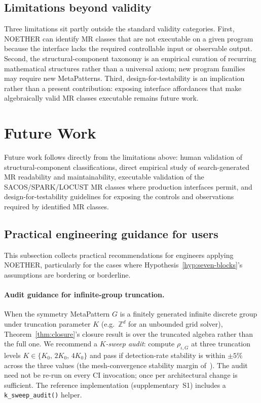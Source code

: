 \documentclass[acmsmall,screen,review]{acmart}
\begin{document}
\subsection{Limitations beyond validity}
\label{subsec:limitations-beyond-validity}

Three limitations sit partly outside the standard validity categories. First, NOETHER can identify MR classes that are not executable on a given program because the interface lacks the required controllable input or observable output. Second, the structural-component taxonomy is an empirical curation of recurring mathematical structures rather than a universal axiom; new program families may require new MetaPatterns. Third, design-for-testability is an implication rather than a present contribution: exposing interface affordances that make algebraically valid MR classes executable remains future work.

\section{Future Work}
\label{sec:future-work}

Future work follows directly from the limitations above: human validation of structural-component classifications, direct empirical study of search-generated MR readability and maintainability, executable validation of the SACOS/SPARK/LOCUST MR classes where production interfaces permit, and design-for-testability guidelines for exposing the controls and observations required by identified MR classes.

\subsection{Practical engineering guidance for users}
\label{subsec:engineering-guidance}

This subsection collects practical recommendations for engineers applying NOETHER, particularly for the cases where Hypothesis~\ref{hyp:seven-blocks}'s assumptions are bordering or borderline.

\paragraph{Audit guidance for infinite-group truncation.} When the symmetry MetaPattern $G$ is a finitely generated infinite discrete group under truncation parameter $K$ (e.g.\ $\mathbb{Z}^{d}$ for an unbounded grid solver), Theorem~\ref{thm:closure}'s closure result is over the truncated algebra rather than the full one. We recommend a \emph{$K$-sweep audit}: compute $\rho_{\iota,G}$ at three truncation levels $K \in \{K_0,\, 2K_0,\, 4K_0\}$ and pass if detection-rate stability is within $\pm 5\%$ across the three values (the mesh-convergence stability margin of~\cite[\S6.2]{LewisMiller1993}). The audit need not be re-run on every CI invocation; once per architectural change is sufficient. The reference implementation (supplementary~S1) includes a \texttt{k\_sweep\_audit()} helper.
\end{document}
